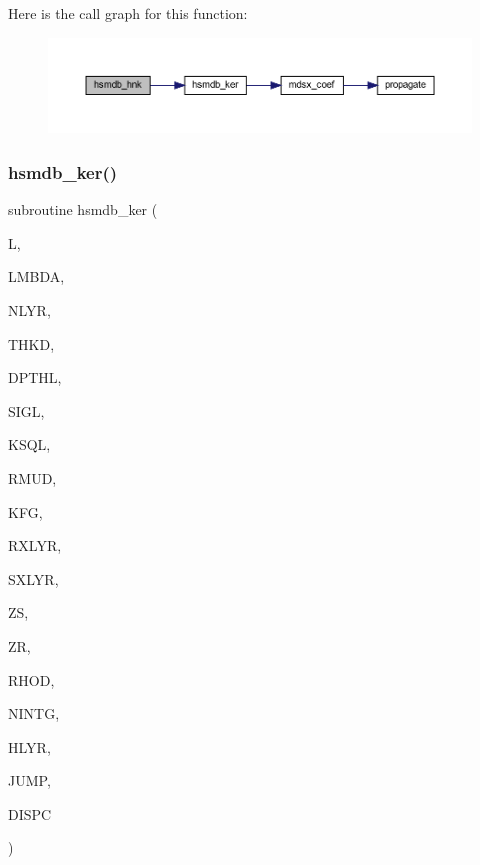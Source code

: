 Here is the call graph for this function\+:\nopagebreak
\begin{figure}[H]
\begin{center}
\leavevmode
\includegraphics[width=350pt]{Leroi__c_8f90_a5f1c5171e9808d392bd660bf9b9ed928_cgraph}
\end{center}
\end{figure}
\mbox{\label{Leroi__c_8f90_a9f61ced82ed6f25a1f5f66c18711044a}} 
\subsubsection{\texorpdfstring{hsmdb\+\_\+ker()}{hsmdb\_ker()}}
{\footnotesize\ttfamily subroutine hsmdb\+\_\+ker (\begin{DoxyParamCaption}\item[{integer}]{L,  }\item[{real(kind=ql)}]{L\+M\+B\+DA,  }\item[{integer}]{N\+L\+YR,  }\item[{real(kind=ql), dimension (nlyr)}]{T\+H\+KD,  }\item[{real(kind=ql), dimension (nlyr)}]{D\+P\+T\+HL,  }\item[{complex(kind=ql), dimension(nlyr)}]{S\+I\+GL,  }\item[{complex(kind=ql), dimension(nlyr)}]{K\+S\+QL,  }\item[{real(kind=ql), dimension(0\+:nlyr)}]{R\+M\+UD,  }\item[{integer}]{K\+FG,  }\item[{integer}]{R\+X\+L\+YR,  }\item[{integer}]{S\+X\+L\+YR,  }\item[{real(kind=ql)}]{ZS,  }\item[{real(kind=ql)}]{ZR,  }\item[{real(kind=ql)}]{R\+H\+OD,  }\item[{integer}]{N\+I\+N\+TG,  }\item[{complex(kind=ql), dimension(nintg)}]{H\+L\+YR,  }\item[{logical}]{J\+U\+MP,  }\item[{complex(kind=ql)}]{D\+I\+S\+PC }\end{DoxyParamCaption})}

